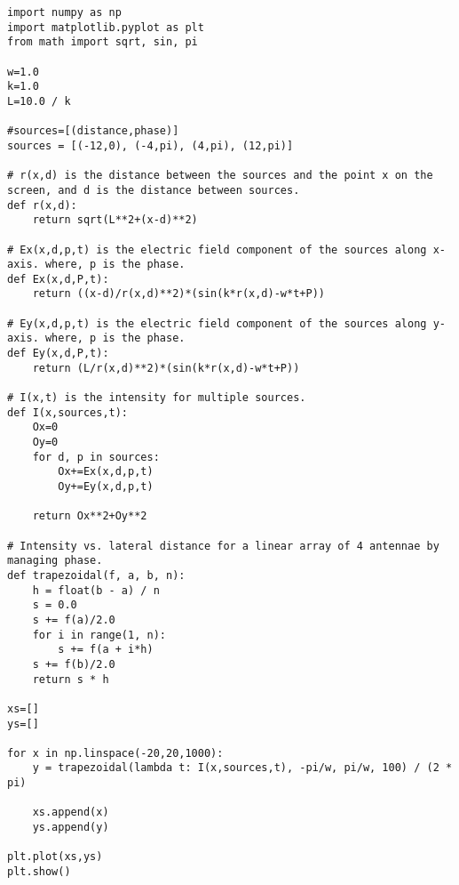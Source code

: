 \begin{Verbatim}[fontsize=\small,baselinestretch=0.9]
import numpy as np
import matplotlib.pyplot as plt
from math import sqrt, sin, pi

w=1.0
k=1.0
L=10.0 / k

#sources=[(distance,phase)]
sources = [(-12,0), (-4,pi), (4,pi), (12,pi)]

# r(x,d) is the distance between the sources and the point x on the screen, and d is the distance between sources.
def r(x,d):
    return sqrt(L**2+(x-d)**2)
    
# Ex(x,d,p,t) is the electric field component of the sources along x-axis. where, p is the phase.
def Ex(x,d,P,t):
    return ((x-d)/r(x,d)**2)*(sin(k*r(x,d)-w*t+P))
   
# Ey(x,d,p,t) is the electric field component of the sources along y-axis. where, p is the phase.
def Ey(x,d,P,t):
    return (L/r(x,d)**2)*(sin(k*r(x,d)-w*t+P))
 
# I(x,t) is the intensity for multiple sources.
def I(x,sources,t):
    Ox=0
    Oy=0
    for d, p in sources:
        Ox+=Ex(x,d,p,t)
        Oy+=Ey(x,d,p,t)
    
    return Ox**2+Oy**2
        
# Intensity vs. lateral distance for a linear array of 4 antennae by managing phase.
def trapezoidal(f, a, b, n):
    h = float(b - a) / n
    s = 0.0
    s += f(a)/2.0
    for i in range(1, n):
        s += f(a + i*h)
    s += f(b)/2.0
    return s * h

xs=[]
ys=[]

for x in np.linspace(-20,20,1000):
    y = trapezoidal(lambda t: I(x,sources,t), -pi/w, pi/w, 100) / (2 * pi)
   
    xs.append(x)
    ys.append(y)

plt.plot(xs,ys)
plt.show()
\end{Verbatim}
